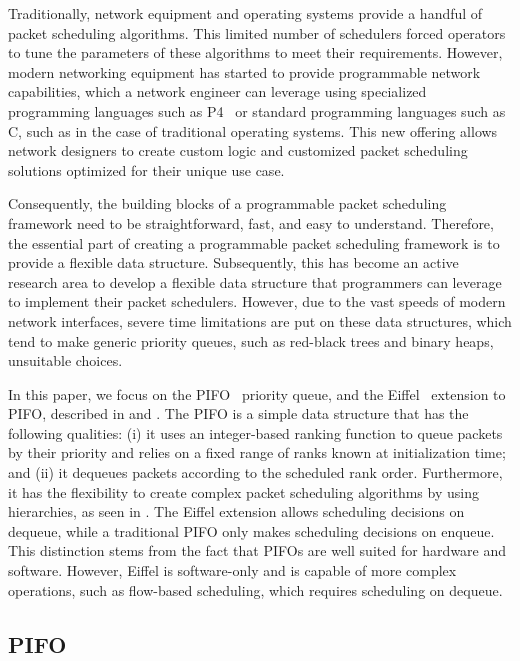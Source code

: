 \documentclass[sigconf, nonacm]{acmart}
\begin{document}
Traditionally, network equipment and operating systems provide a handful of packet scheduling algorithms. This limited number of schedulers forced operators to tune the parameters of these algorithms to meet their requirements. However, modern networking equipment has started to provide programmable network capabilities, which a network engineer can leverage using specialized programming languages such as P4~\cite{p4} or standard programming languages such as C, such as in the case of traditional operating systems. This new offering allows network designers to create custom logic and customized packet scheduling solutions optimized for their unique use case.

Consequently, the building blocks of a programmable packet scheduling framework need to be straightforward, fast, and easy to understand. Therefore, the essential part of creating a programmable packet scheduling framework is to provide a flexible data structure. Subsequently, this has become an active research area to develop a flexible data structure that programmers can leverage to implement their packet schedulers. However, due to the vast speeds of modern network interfaces, severe time limitations are put on these data structures, which tend to make generic priority queues, such as red-black trees and binary heaps, unsuitable choices.

In this paper, we focus on the PIFO~\cite{Sivaraman2016} priority queue, and the Eiffel~\cite{Saeed2019} extension to PIFO, described in  and . The PIFO is a simple data structure that has the following qualities: (i) it uses an integer-based ranking function to queue packets by their priority and relies on a fixed range of ranks known at initialization time; and (ii) it dequeues packets according to the scheduled rank order. Furthermore, it has the flexibility to create complex packet scheduling algorithms by using hierarchies, as seen in . The Eiffel extension allows scheduling decisions on dequeue, while a traditional PIFO only makes scheduling decisions on enqueue. This distinction stems from the fact that PIFOs are well suited for hardware and software. However, Eiffel is software-only and is capable of more complex operations, such as flow-based scheduling, which requires scheduling on dequeue.


\subsection{PIFO} \label{sec:pifo}
\end{document}
